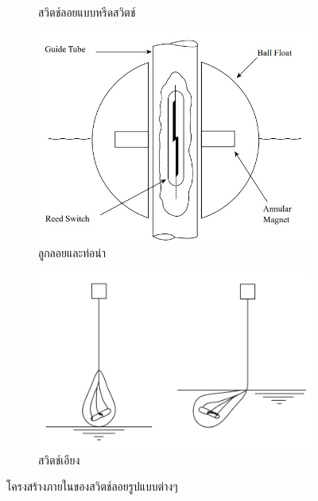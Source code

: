 \documentclass[final,11pt]{article}
\begin{document}
\begin{figure}
\begin{subfigure}[b]{0.4\textwidth}
        \caption{สวิตช์ลอยแบบหรีดสวิตช์}
        \label{fig:mcfs2}
    \end{subfigure}
    \hfill
    \begin{subfigure}[b]{0.4\textwidth}
        \centering
        \includegraphics[width=\textwidth]{images/Screenshot_3.jpg}
        \caption{ลูกลอยและท่อนำ}
        \label{fig:mcfs3}
    \end{subfigure}
    \hfill
    \begin{subfigure}[b]{0.4\textwidth}
        \centering
        \includegraphics[width=\textwidth]{images/Screenshot_5.jpg}
        \caption{สวิตช์เอียง}
        \label{fig:mcfs4}
    \end{subfigure}
    \hfill
    \caption{โครงสร้างภายในของสวิตช์ลอยรูปแบบต่างๆ}
    \label{fig:mcfs}
\end{figure}
\end{document}
